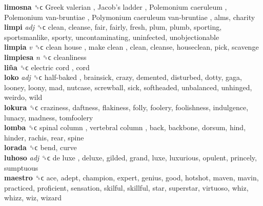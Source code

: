 \textbf{limosna} ␝ϲ   Greek valerian ,  Jacob’s ladder ,  Polemonium caeruleum ,  Polemonium van-bruntiae ,  Polymonium caeruleum van-bruntiae , alms, charity  \\
\textbf{limpi} \emph{adj}  ␝ϲ  clean, cleanse, fair, fairly, fresh, plum, plumb, sporting, sportsmanlike, sporty, uncontaminating, uninfected, unobjectionable  \\
\textbf{limpia} \emph{v}  ␝ϲ   clean house ,  make clean , clean, cleanse, houseclean, pick, scavenge  \\
\textbf{limpiesa} \emph{n}  ␝ϲ  cleanliness  \\
\textbf{liña} ␝ϲ   electric cord , cord  \\
\textbf{loko} \emph{adj}  ␝ϲ   half-baked , brainsick, crazy, demented, disturbed, dotty, gaga, looney, loony, mad, nutcase, screwball, sick, softheaded, unbalanced, unhinged, weirdo, wild  \\
\textbf{lokura} ␝ϲ  craziness, daftness, flakiness, folly, foolery, foolishness, indulgence, lunacy, madness, tomfoolery  \\
\textbf{lomba} ␝ϲ   spinal column ,  vertebral column , back, backbone, dorsum, hind, hinder, rachis, rear, spine  \\
\textbf{lorada} ␝ϲ  bend, curve  \\
\textbf{luhoso} \emph{adj}  ␝ϲ   de luxe , deluxe, gilded, grand, luxe, luxurious, opulent, princely, sumptuous  \\
\textbf{maestro} ␝ϲ  ace, adept, champion, expert, genius, good, hotshot, maven, mavin, practiced, proficient, sensation, skilful, skillful, star, superstar, virtuoso, whiz, whizz, wiz, wizard  \\
